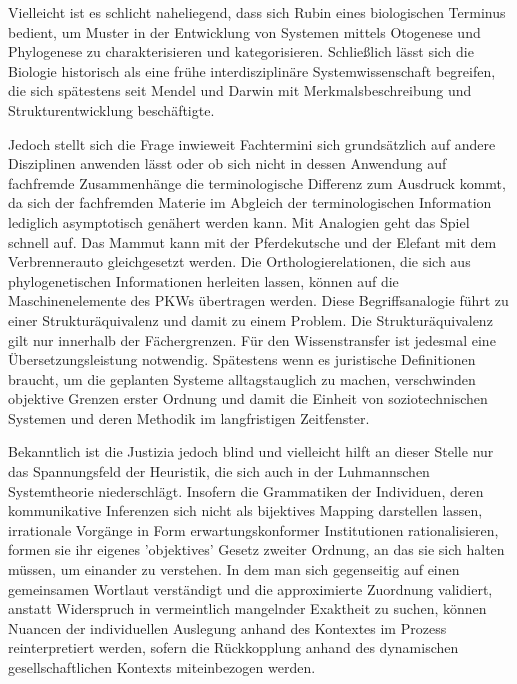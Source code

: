 \documentclass[a4paper,11pt]{article}
\begin{document}
Vielleicht ist es schlicht naheliegend, dass sich Rubin eines biologischen Terminus bedient, um Muster in der Entwicklung von Systemen 
mittels Otogenese und Phylogenese zu charakterisieren und kategorisieren. Schließlich lässt sich die Biologie historisch als eine frühe 
interdisziplinäre Systemwissenschaft begreifen, die sich spätestens seit Mendel und Darwin mit Merkmalsbeschreibung und Strukturentwicklung
beschäftigte.\cite{Taxonomie}


Jedoch stellt sich die Frage inwieweit Fachtermini sich grundsätzlich auf andere Disziplinen anwenden lässt oder ob sich nicht in dessen Anwendung 
auf fachfremde Zusammenhänge die terminologische Differenz zum Ausdruck kommt, da sich der fachfremden Materie im Abgleich der terminologischen Information 
lediglich asymptotisch genähert werden kann. Mit Analogien geht das Spiel schnell auf. Das Mammut kann mit der Pferdekutsche und der Elefant mit dem
Verbrennerauto gleichgesetzt werden. Die Orthologierelationen, die sich aus phylogenetischen Informationen herleiten lassen, können auf die
Maschinenelemente des PKWs übertragen werden. Diese Begriffsanalogie führt zu einer Strukturäquivalenz und damit zu einem Problem. 
Die Strukturäquivalenz gilt nur innerhalb der Fächergrenzen. Für den Wissenstransfer ist jedesmal eine Übersetzungsleistung notwendig. Spätestens
wenn es juristische Definitionen braucht, um die geplanten Systeme alltagstauglich zu machen, verschwinden objektive Grenzen erster Ordnung 
und damit die Einheit von soziotechnischen Systemen und deren Methodik im langfristigen Zeitfenster. 


Bekanntlich ist die Justizia jedoch blind und vielleicht hilft an dieser Stelle nur das Spannungsfeld der Heuristik, die
sich auch in der Luhmannschen Systemtheorie niederschlägt. Insofern die Grammatiken der Individuen, deren kommunikative Inferenzen sich nicht
als bijektives Mapping darstellen lassen, irrationale Vorgänge in Form erwartungskonformer Institutionen rationalisieren, formen sie ihr eigenes
'objektives' Gesetz zweiter Ordnung, an das sie sich halten müssen, um einander zu verstehen. In dem man sich gegenseitig auf einen gemeinsamen
Wortlaut verständigt und die approximierte Zuordnung validiert, anstatt Widerspruch in vermeintlich mangelnder Exaktheit zu suchen, können Nuancen
der individuellen Auslegung anhand des Kontextes im Prozess reinterpretiert werden, sofern die Rückkopplung anhand des dynamischen gesellschaftlichen
Kontexts miteinbezogen werden.
\end{document}
